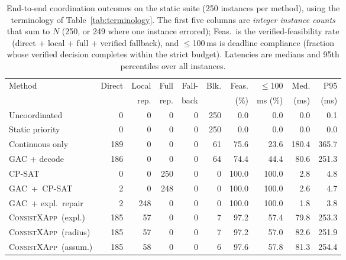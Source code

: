 \documentclass[pdflatex,sn-mathphys-num,iicol,oneside]{sn-jnl}
\newcommand{\method}{\textsc{ConsistXApp}}
\newcommand{\gac}{\textsc{GAC}}
\newcommand{\cpsat}{\textsc{CP-SAT}}
\begin{document}
\begin{table}[t]
\centering
\caption{End-to-end coordination outcomes on the static suite
(250 instances per method), using the terminology of
Table~\ref{tab:terminology}. The first five columns are \emph{integer
instance counts} that sum to $N$ (250, or 249 where one instance
errored); Feas.\ is the verified-feasibility rate (direct + local +
full + verified fallback), and $\le$100\,ms is deadline compliance
(fraction whose verified decision completes within the strict budget).
Latencies are medians and 95th percentiles over all instances.}
\label{tab:main-results}
\setlength{\tabcolsep}{4pt}\small
\begin{tabular}{lrrrrrrrrr}
\toprule
Method & Direct & Local & Full & Fall- & Blk. & Feas. & $\le$100 & Med. & P95\\
& & rep. & rep. & back & & (\%) & ms (\%) & (ms) & (ms)\\
\midrule
Uncoordinated & 0 & 0 & 0 & 0 & 250 & 0.0 & 0.0 & 0.0 & 0.1\\
Static priority & 0 & 0 & 0 & 0 & 250 & 0.0 & 0.0 & 0.0 & 0.0\\
Continuous only & 189 & 0 & 0 & 0 & 61 & 75.6 & 23.6 & 180.4 & 365.7\\
GAC + decode & 186 & 0 & 0 & 0 & 64 & 74.4 & 44.4 & 80.6 & 251.3\\
\cpsat & 0 & 0 & 250 & 0 & 0 & 100.0 & 100.0 & 2.8 & 4.8\\
\gac\ +\ \cpsat & 2 & 0 & 248 & 0 & 0 & 100.0 & 100.0 & 2.6 & 4.7\\
\gac\ + expl.\ repair & 2 & 248 & 0 & 0 & 0 & 100.0 & 100.0 & 1.8 & 3.8\\
\method\ (expl.) & 185 & 57 & 0 & 0 & 7 & 97.2 & 57.4 & 79.8 & 253.3\\
\method\ (radius) & 185 & 57 & 0 & 0 & 7 & 97.2 & 57.0 & 82.6 & 251.9\\
\method\ (assum.) & 185 & 58 & 0 & 0 & 6 & 97.6 & 57.8 & 81.3 & 254.4\\
\bottomrule
\end{tabular}
\normalsize
\end{table}
\end{document}

